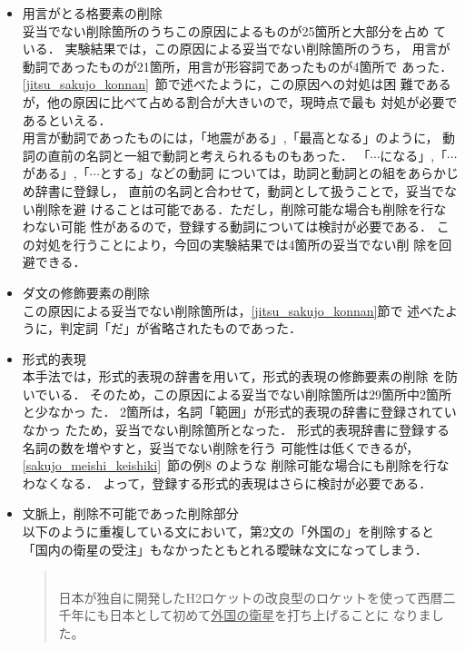 \begin{itemize}
 \item 用言がとる格要素の削除\\
       妥当でない削除箇所のうちこの原因によるものが25箇所と大部分を占め
       ている．
       実験結果では，この原因による妥当でない削除箇所のうち，
       用言が動詞であったものが21箇所，用言が形容詞であったものが4箇所で
       あった．
       \ref{jitsu_sakujo_konnan}~節で述べたように，この原因への対処は困
       難であるが，他の原因に比べて占める割合が大きいので，現時点で最も
       対処が必要であるといえる．\\
       用言が動詞であったものには，「地震がある」,「最高となる」のように，
       動詞の直前の名詞と一組で動詞と考えられるものもあった．
       「$\cdots$になる」,「$\cdots$がある」,「$\cdots$とする」などの動詞
       については，助詞と動詞との組をあらかじめ辞書に登録し，
       直前の名詞と合わせて，動詞として扱うことで，妥当でない削除を避
       けることは可能である．ただし，削除可能な場合も削除を行なわない可能
       性があるので，登録する動詞については検討が必要である．
       この対処を行うことにより，今回の実験結果では4箇所の妥当でない削
       除を回避できる．
 \item ダ文の修飾要素の削除\\
       この原因による妥当でない削除箇所は，\ref{jitsu_sakujo_konnan}節で
       述べたように，判定詞「だ」が省略されたものであった．
 \item 形式的表現\\
       本手法では，形式的表現の辞書を用いて，形式的表現の修飾要素の削除
       を防いでいる．
       そのため，この原因による妥当でない削除箇所は29箇所中2箇所と少なかっ
       た．
       2箇所は，名詞「範囲」が形式的表現の辞書に登録されていなかっ
       たため，妥当でない削除箇所となった．
       形式的表現辞書に登録する名詞の数を増やすと，妥当でない削除を行う
       可能性は低くできるが，\ref{sakujo_meishi_keishiki}~節の例8 のような
       削除可能な場合にも削除を行なわなくなる．
       よって，登録する形式的表現はさらに検討が必要である．
 \item 文脈上，削除不可能であった削除部分\\
       以下のように重複している文において，第2文の「外国の」を削除すると
       「国内の衛星の受注」もなかったともとれる曖昧な文になってしまう．
\vspace{5mm}       \begin{quote} \label{rei:rei18}
	\hspace*{-1em}{\bf 例19：}\\
	日本が独自に開発したH2ロケットの改良型のロケットを使って西暦二
	千年にも日本として初めて\underline{外国の衛星}を打ち上げることに
	なりました。
	

\end{quote}
\end{itemize}
